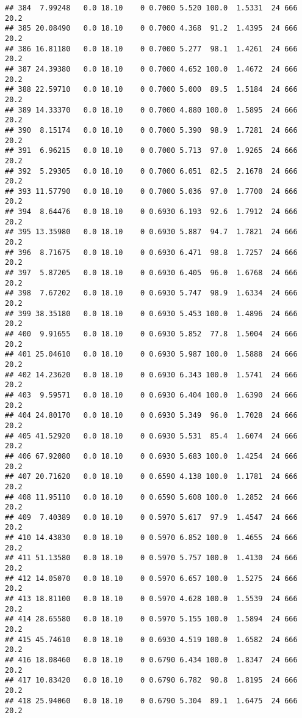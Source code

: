\documentclass[]{article}
\begin{document}
\begin{verbatim}
## 384  7.99248   0.0 18.10    0 0.7000 5.520 100.0  1.5331  24 666    20.2
## 385 20.08490   0.0 18.10    0 0.7000 4.368  91.2  1.4395  24 666    20.2
## 386 16.81180   0.0 18.10    0 0.7000 5.277  98.1  1.4261  24 666    20.2
## 387 24.39380   0.0 18.10    0 0.7000 4.652 100.0  1.4672  24 666    20.2
## 388 22.59710   0.0 18.10    0 0.7000 5.000  89.5  1.5184  24 666    20.2
## 389 14.33370   0.0 18.10    0 0.7000 4.880 100.0  1.5895  24 666    20.2
## 390  8.15174   0.0 18.10    0 0.7000 5.390  98.9  1.7281  24 666    20.2
## 391  6.96215   0.0 18.10    0 0.7000 5.713  97.0  1.9265  24 666    20.2
## 392  5.29305   0.0 18.10    0 0.7000 6.051  82.5  2.1678  24 666    20.2
## 393 11.57790   0.0 18.10    0 0.7000 5.036  97.0  1.7700  24 666    20.2
## 394  8.64476   0.0 18.10    0 0.6930 6.193  92.6  1.7912  24 666    20.2
## 395 13.35980   0.0 18.10    0 0.6930 5.887  94.7  1.7821  24 666    20.2
## 396  8.71675   0.0 18.10    0 0.6930 6.471  98.8  1.7257  24 666    20.2
## 397  5.87205   0.0 18.10    0 0.6930 6.405  96.0  1.6768  24 666    20.2
## 398  7.67202   0.0 18.10    0 0.6930 5.747  98.9  1.6334  24 666    20.2
## 399 38.35180   0.0 18.10    0 0.6930 5.453 100.0  1.4896  24 666    20.2
## 400  9.91655   0.0 18.10    0 0.6930 5.852  77.8  1.5004  24 666    20.2
## 401 25.04610   0.0 18.10    0 0.6930 5.987 100.0  1.5888  24 666    20.2
## 402 14.23620   0.0 18.10    0 0.6930 6.343 100.0  1.5741  24 666    20.2
## 403  9.59571   0.0 18.10    0 0.6930 6.404 100.0  1.6390  24 666    20.2
## 404 24.80170   0.0 18.10    0 0.6930 5.349  96.0  1.7028  24 666    20.2
## 405 41.52920   0.0 18.10    0 0.6930 5.531  85.4  1.6074  24 666    20.2
## 406 67.92080   0.0 18.10    0 0.6930 5.683 100.0  1.4254  24 666    20.2
## 407 20.71620   0.0 18.10    0 0.6590 4.138 100.0  1.1781  24 666    20.2
## 408 11.95110   0.0 18.10    0 0.6590 5.608 100.0  1.2852  24 666    20.2
## 409  7.40389   0.0 18.10    0 0.5970 5.617  97.9  1.4547  24 666    20.2
## 410 14.43830   0.0 18.10    0 0.5970 6.852 100.0  1.4655  24 666    20.2
## 411 51.13580   0.0 18.10    0 0.5970 5.757 100.0  1.4130  24 666    20.2
## 412 14.05070   0.0 18.10    0 0.5970 6.657 100.0  1.5275  24 666    20.2
## 413 18.81100   0.0 18.10    0 0.5970 4.628 100.0  1.5539  24 666    20.2
## 414 28.65580   0.0 18.10    0 0.5970 5.155 100.0  1.5894  24 666    20.2
## 415 45.74610   0.0 18.10    0 0.6930 4.519 100.0  1.6582  24 666    20.2
## 416 18.08460   0.0 18.10    0 0.6790 6.434 100.0  1.8347  24 666    20.2
## 417 10.83420   0.0 18.10    0 0.6790 6.782  90.8  1.8195  24 666    20.2
## 418 25.94060   0.0 18.10    0 0.6790 5.304  89.1  1.6475  24 666    20.2

\end{verbatim}
\end{document}
